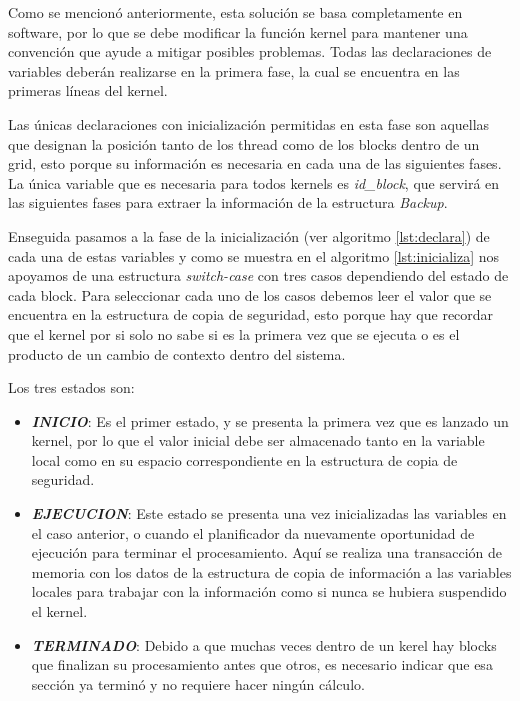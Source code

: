 Como se mencionó anteriormente, esta solución se basa completamente en software, por lo que se debe modificar la función kernel para mantener una convención que ayude a mitigar posibles problemas. Todas las declaraciones de variables deberán realizarse en la primera fase, la cual se encuentra en las primeras líneas del kernel.
\newline

Las únicas declaraciones con inicialización permitidas en esta fase son aquellas que designan la posición tanto de los thread como de los blocks dentro de un grid, esto porque  su información es necesaria en cada una de las siguientes fases. La única variable que es necesaria para todos kernels es \textit{id\_block}, que servirá en las siguientes fases para extraer la información de la estructura \textit{Backup}.



Enseguida pasamos a la fase de la inicialización (ver algoritmo \ref{lst:declara}) de cada una de estas variables y como se muestra en el algoritmo \ref{lst:inicializa} nos apoyamos de una estructura \textit{switch-case} con tres casos dependiendo del estado de cada block. Para seleccionar cada uno de los casos debemos leer el valor que se encuentra en la estructura de copia de seguridad, esto porque hay que recordar que el kernel por si solo no sabe si es la primera vez que se ejecuta o es el producto de un cambio de contexto dentro del sistema.
\newline

Los tres estados son:

\begin{itemize}
\item \textit{\textbf{INICIO}}: Es el primer estado, y se presenta la primera vez que es lanzado un kernel, por lo que el valor inicial debe ser almacenado tanto en la variable local como en su espacio correspondiente en la estructura de copia de seguridad.

\item \textit{\textbf{EJECUCION}}: Este estado se presenta una vez inicializadas las variables en el caso anterior, o cuando el planificador da nuevamente oportunidad de ejecución para terminar el procesamiento. Aquí se realiza una transacción de memoria con los datos de la estructura de copia de información a las variables locales para trabajar con la información como si nunca se hubiera suspendido el kernel.

\item \textit{\textbf{TERMINADO}}: Debido a que muchas veces dentro de un kerel hay blocks que finalizan su procesamiento antes que otros, es necesario indicar que esa sección ya terminó y no requiere hacer ningún cálculo.
\end{itemize}

